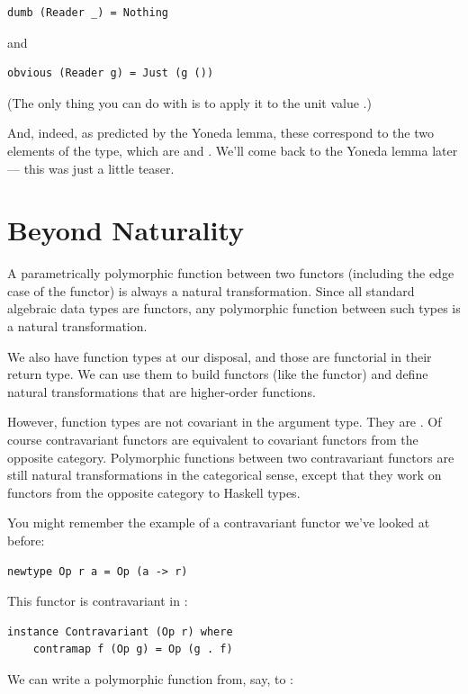 \begin{verbatim}
dumb (Reader _) = Nothing
\end{verbatim}
and

\begin{verbatim}
obvious (Reader g) = Just (g ())
\end{verbatim}
(The only thing you can do with  is to apply it to the unit
value \code{()}.)

And, indeed, as predicted by the Yoneda lemma, these correspond to the
two elements of the  type, which are 
and . We'll come back to the Yoneda lemma later ---
this was just a little teaser.

\section{Beyond Naturality}\label{beyond-naturality}

A parametrically polymorphic function between two functors (including
the edge case of the  functor) is always a natural
transformation. Since all standard algebraic data types are functors,
any polymorphic function between such types is a natural transformation.

We also have function types at our disposal, and those are functorial in
their return type. We can use them to build functors (like the
 functor) and define natural transformations that are
higher-order functions.

However, function types are not covariant in the argument type. They are
. Of course contravariant functors are equivalent to
covariant functors from the opposite category. Polymorphic functions
between two contravariant functors are still natural transformations in
the categorical sense, except that they work on functors from the
opposite category to Haskell types.

You might remember the example of a contravariant functor we've looked
at before:

\begin{verbatim}
newtype Op r a = Op (a -> r)
\end{verbatim}
This functor is contravariant in :

\begin{verbatim}
instance Contravariant (Op r) where
    contramap f (Op g) = Op (g . f)
\end{verbatim}
We can write a polymorphic function from, say,  to
:

